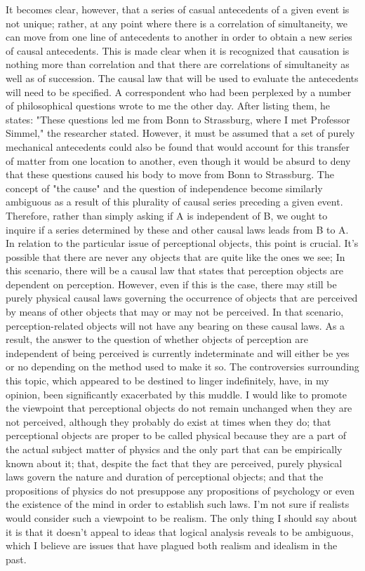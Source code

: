 \documentclass[a4paper,12pt]{book}[2004/02/16]
\theoremstyle{ilemma}
\theoremstyle{itheorem}
\theoremstyle{iother}
\theoremstyle{icorollary}
\theoremstyle{numcorollary}
\theoremstyle{idefinition}
\begin{document}
It becomes clear, however, that a series of casual antecedents of a given event is not unique; rather, at any point where there is a correlation of simultaneity, we can move from one line of antecedents to another in order to obtain a new series of causal antecedents. This is made clear when it is recognized that causation is nothing more than correlation and that there are correlations of simultaneity as well as of succession. The causal law that will be used to evaluate the antecedents will need to be specified. A correspondent who had been perplexed by a number of philosophical questions wrote to me the other day. After listing them, he states:
"These questions led me from Bonn to Strassburg, where I met Professor Simmel," the researcher stated. However, it must be assumed that a set of purely mechanical antecedents could also be found that would account for this transfer of matter from one location to another, even though it would be absurd to deny that these questions caused his body to move from Bonn to Strassburg. The concept of "the cause" and the question of independence become similarly ambiguous as a result of this plurality of causal series preceding a given event. Therefore, rather than simply asking if A is independent of B, we ought to inquire if a series determined by these and other causal laws leads from B to A. In relation to the particular issue of perceptional objects, this point is crucial. It's possible that there are never any objects that are quite like the ones we see;
In this scenario, there will be a causal law that states that perception objects are dependent on perception. However, even if this is the case, there may still be purely physical causal laws governing the occurrence of objects that are perceived by means of other objects that may or may not be perceived.
In that scenario, perception-related objects will not have any bearing on these causal laws. As a result, the answer to the question of whether objects of perception are independent of being perceived is currently indeterminate and will either be yes or no depending on the method used to make it so. The controversies surrounding this topic, which appeared to be destined to linger indefinitely, have, in my opinion, been significantly exacerbated by this muddle. I would like to promote the viewpoint that perceptional objects do not remain unchanged when they are not perceived, although they probably do exist at times when they do; that perceptional objects are proper to be called physical because they are a part of the actual subject matter of physics and the only part that can be empirically known about it; that, despite the fact that they are perceived, purely physical laws govern the nature and duration of perceptional objects; and that the propositions of physics do not presuppose any propositions of psychology or even the existence of the mind in order to establish such laws. I'm not sure if realists would consider such a viewpoint to be realism. The only thing I should say about it is that it doesn't appeal to ideas that logical analysis reveals to be ambiguous, which I believe are issues that have plagued both realism and idealism in the past.
\end{document}

